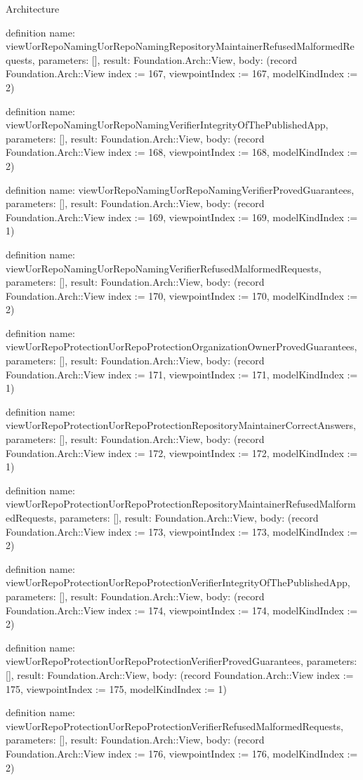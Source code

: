 \begin{lexlean}{Architecture}
\begin{semanticmodule}
definition{
  name: viewUorRepoNamingUorRepoNamingRepositoryMaintainerRefusedMalformedRequests,
  parameters: [],
  result: Foundation.Arch::View,
  body: (record Foundation.Arch::View {index := 167, viewpointIndex := 167, modelKindIndex := 2})
}

definition{
  name: viewUorRepoNamingUorRepoNamingVerifierIntegrityOfThePublishedApp,
  parameters: [],
  result: Foundation.Arch::View,
  body: (record Foundation.Arch::View {index := 168, viewpointIndex := 168, modelKindIndex := 2})
}

definition{
  name: viewUorRepoNamingUorRepoNamingVerifierProvedGuarantees,
  parameters: [],
  result: Foundation.Arch::View,
  body: (record Foundation.Arch::View {index := 169, viewpointIndex := 169, modelKindIndex := 1})
}

definition{
  name: viewUorRepoNamingUorRepoNamingVerifierRefusedMalformedRequests,
  parameters: [],
  result: Foundation.Arch::View,
  body: (record Foundation.Arch::View {index := 170, viewpointIndex := 170, modelKindIndex := 2})
}

definition{
  name: viewUorRepoProtectionUorRepoProtectionOrganizationOwnerProvedGuarantees,
  parameters: [],
  result: Foundation.Arch::View,
  body: (record Foundation.Arch::View {index := 171, viewpointIndex := 171, modelKindIndex := 1})
}

definition{
  name: viewUorRepoProtectionUorRepoProtectionRepositoryMaintainerCorrectAnswers,
  parameters: [],
  result: Foundation.Arch::View,
  body: (record Foundation.Arch::View {index := 172, viewpointIndex := 172, modelKindIndex := 1})
}

definition{
  name: viewUorRepoProtectionUorRepoProtectionRepositoryMaintainerRefusedMalformedRequests,
  parameters: [],
  result: Foundation.Arch::View,
  body: (record Foundation.Arch::View {index := 173, viewpointIndex := 173, modelKindIndex := 2})
}

definition{
  name: viewUorRepoProtectionUorRepoProtectionVerifierIntegrityOfThePublishedApp,
  parameters: [],
  result: Foundation.Arch::View,
  body: (record Foundation.Arch::View {index := 174, viewpointIndex := 174, modelKindIndex := 2})
}

definition{
  name: viewUorRepoProtectionUorRepoProtectionVerifierProvedGuarantees,
  parameters: [],
  result: Foundation.Arch::View,
  body: (record Foundation.Arch::View {index := 175, viewpointIndex := 175, modelKindIndex := 1})
}

definition{
  name: viewUorRepoProtectionUorRepoProtectionVerifierRefusedMalformedRequests,
  parameters: [],
  result: Foundation.Arch::View,
  body: (record Foundation.Arch::View {index := 176, viewpointIndex := 176, modelKindIndex := 2})
}


\end{semanticmodule}
\end{lexlean}
